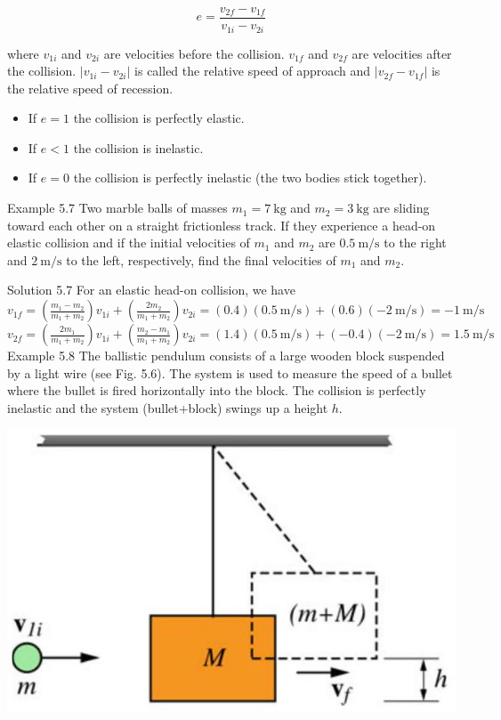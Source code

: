 \documentclass[10pt]{article}
\begin{document}
$$
e=\frac{v_{2 f}-v_{1 f}}{v_{1 i}-v_{2 i}}
$$

where $v_{1 i}$ and $v_{2 i}$ are velocities before the collision. $v_{1 f}$ and $v_{2 f}$ are velocities after the collision. $\left|v_{1 i}-v_{2 i}\right|$ is called the relative speed of approach and $\left|v_{2 f}-v_{1 f}\right|$ is the relative speed of recession.

\begin{itemize}
  \item If $e=1$ the collision is perfectly elastic.
  \item If $e<1$ the collision is inelastic.
  \item If $e=0$ the collision is perfectly inelastic (the two bodies stick together).
\end{itemize}

Example 5.7 Two marble balls of masses $m_{1}=7 \mathrm{~kg}$ and $m_{2}=3 \mathrm{~kg}$ are sliding toward each other on a straight frictionless track. If they experience a head-on elastic collision and if the initial velocities of $m_{1}$ and $m_{2}$ are $0.5 \mathrm{~m} / \mathrm{s}$ to the right and $2 \mathrm{~m} / \mathrm{s}$ to the left, respectively, find the final velocities of $m_{1}$ and $m_{2}$.

Solution 5.7 For an elastic head-on collision, we have\\
$v_{1 f}=\left(\frac{m_{1}-m_{2}}{m_{1}+m_{2}}\right) v_{1 i}+\left(\frac{2 m_{2}}{m_{1}+m_{2}}\right) v_{2 i}=(0.4)(0.5 \mathrm{~m} / \mathrm{s})+(0.6)(-2 \mathrm{~m} / \mathrm{s})=-1 \mathrm{~m} / \mathrm{s}$\\
$v_{2 f}=\left(\frac{2 m_{1}}{m_{1}+m_{2}}\right) v_{1 i}+\left(\frac{m_{2}-m_{1}}{m_{1}+m_{2}}\right) v_{2 i}=(1.4)(0.5 \mathrm{~m} / \mathrm{s})+(-0.4)(-2 \mathrm{~m} / \mathrm{s})=1.5 \mathrm{~m} / \mathrm{s}$\\
Example 5.8 The ballistic pendulum consists of a large wooden block suspended by a light wire (see Fig. 5.6). The system is used to measure the speed of a bullet where the bullet is fired horizontally into the block. The collision is perfectly inelastic and the system (bullet+block) swings up a height $h$.

\begin{center}
\includegraphics[max width=\textwidth]{2024_09_13_db1f357d2aad0a03eb2eg-087(1)}
\end{center}
\end{document}
